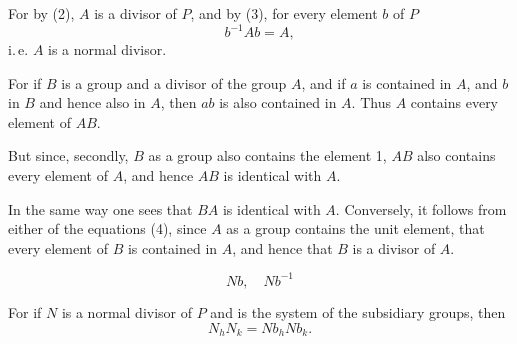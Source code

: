 




For by (2), $A$ is a divisor of $P$, and by (3), for every element $b$ of $P$
\[
b^{-1}Ab = A,
\]
i.\,e. $A$ is a normal divisor.




For if $B$ is a group and a divisor of the group $A$, and if $a$ is contained in $A$, and $b$ in $B$ and hence also in $A$, then $ab$ is also contained in $A$. Thus $A$ contains every element of $AB$.

But since, secondly, $B$ as a group also contains the element 1, $AB$ also contains every element of $A$, and hence $AB$ is identical with $A$.

In the same way one sees that $BA$ is identical with $A$. Conversely, it follows from either of the equations (4), since $A$ as a group contains the unit element, that every element of $B$ is contained in $A$, and hence that $B$ is a divisor of $A$.

\[
Nb, \quad Nb^{-1}
\]

For if $N$ is a normal divisor of $P$ and
is the system of the subsidiary groups, then
\[
N_h N_k = N b_h N b_k.
\]
